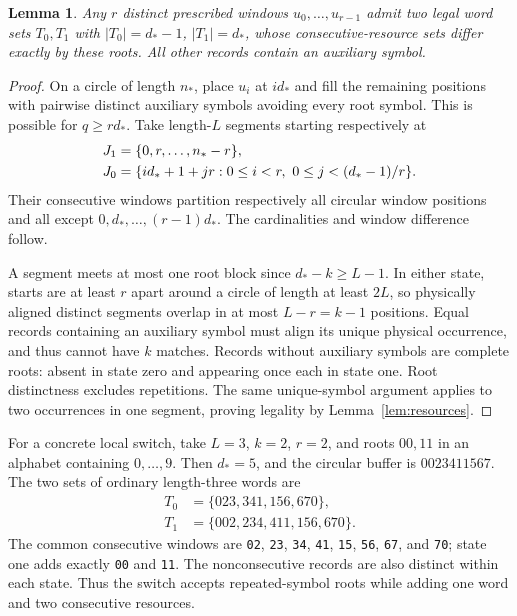 \documentclass[12pt,letterpaper,onecolumn]{article}
\newtheorem{lemma}[theorem]{Lemma}
\theoremstyle{definition}
\begin{document}
\begin{lemma}\label{lem:switch}
Any $r$ distinct prescribed windows $u_0,\ldots,u_{r-1}$ admit two legal word sets $T_0,T_1$ with $|T_0|=d_*-1$, $|T_1|=d_*$, whose consecutive-resource sets differ exactly by these roots. All other records contain an auxiliary symbol.
\end{lemma}
\begin{proof}
On a circle of length $n_*$, place $u_i$ at $id_*$ and fill the remaining positions with pairwise distinct auxiliary symbols avoiding every root symbol. This is possible for $q\ge rd_*$. Take length-$L$ segments starting respectively at
\begin{align}
 J_1&=\{0,r,\ldots,n_*-r\},\notag\\
 J_0&=\{id_*+1+jr:0\le i<r,\ 0\le j<(d_*-1)/r\}.
 \label{eq:starts}
\end{align}
Their consecutive windows partition respectively all circular window positions and all except $0,d_*,\ldots,(r-1)d_*$. The cardinalities and window difference follow.

A segment meets at most one root block since $d_*-k\ge L-1$. In either state, starts are at least $r$ apart around a circle of length at least $2L$, so physically aligned distinct segments overlap in at most $L-r=k-1$ positions. Equal records containing an auxiliary symbol must align its unique physical occurrence, and thus cannot have $k$ matches. Records without auxiliary symbols are complete roots: absent in state zero and appearing once each in state one. Root distinctness excludes repetitions. The same unique-symbol argument applies to two occurrences in one segment, proving legality by Lemma~\ref{lem:resources}.
\end{proof}

For a concrete local switch, take $L=3$, $k=2$, $r=2$, and roots $00,11$ in an alphabet containing $0,\ldots,9$. Then $d_*=5$, and the circular buffer is $0023411567$. The two sets of ordinary length-three words are
\[
 \begin{aligned}
 T_0&=\{023,341,156,670\},\\
 T_1&=\{002,234,411,156,670\}.
 \end{aligned}
\]
The common consecutive windows are \texttt{02}, \texttt{23}, \texttt{34}, \texttt{41}, \texttt{15}, \texttt{56}, \texttt{67}, and \texttt{70}; state one adds exactly \texttt{00} and \texttt{11}. The nonconsecutive records are also distinct within each state. Thus the switch accepts repeated-symbol roots while adding one word and two consecutive resources.
\end{document}
